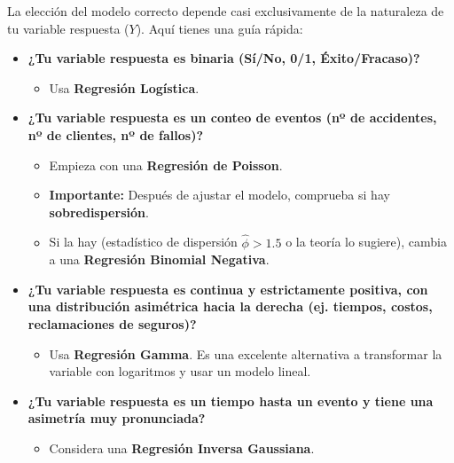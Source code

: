 \documentclass[
  letterpaper,
  DIV=11,
  numbers=noendperiod]{scrreprt}
\providecommand{\tightlist}{%
  \setlength{\itemsep}{0pt}\setlength{\parskip}{0pt}}
\begin{document}
\begin{tcolorbox}[enhanced jigsaw, leftrule=.75mm, breakable, colbacktitle=quarto-callout-warning-color!10!white, bottomrule=.15mm, colframe=quarto-callout-warning-color-frame, toprule=.15mm, colback=white, coltitle=black, bottomtitle=1mm, left=2mm, title=\textcolor{quarto-callout-warning-color}{\faExclamationTriangle}\hspace{0.5em}{¿Qué GLM debo usar?}, opacityback=0, arc=.35mm, opacitybacktitle=0.6, toptitle=1mm, titlerule=0mm, rightrule=.15mm]

La elección del modelo correcto depende casi exclusivamente de la
naturaleza de tu variable respuesta (\(Y\)). Aquí tienes una guía
rápida:

\begin{itemize}
\tightlist
\item
  \textbf{¿Tu variable respuesta es binaria (Sí/No, 0/1,
  Éxito/Fracaso)?}

  \begin{itemize}
  \tightlist
  \item
    Usa \textbf{Regresión Logística}.
  \end{itemize}
\item
  \textbf{¿Tu variable respuesta es un conteo de eventos (nº de
  accidentes, nº de clientes, nº de fallos)?}

  \begin{itemize}
  \tightlist
  \item
    Empieza con una \textbf{Regresión de Poisson}.
  \item
    \textbf{Importante:} Después de ajustar el modelo, comprueba si hay
    \textbf{sobredispersión}.
  \item
    Si la hay (estadístico de dispersión \(\hat{\phi} > 1.5\) o la
    teoría lo sugiere), cambia a una \textbf{Regresión Binomial
    Negativa}.
  \end{itemize}
\item
  \textbf{¿Tu variable respuesta es continua y estrictamente positiva,
  con una distribución asimétrica hacia la derecha (ej. tiempos, costos,
  reclamaciones de seguros)?}

  \begin{itemize}
  \tightlist
  \item
    Usa \textbf{Regresión Gamma}. Es una excelente alternativa a
    transformar la variable con logaritmos y usar un modelo lineal.
  \end{itemize}
\item
  \textbf{¿Tu variable respuesta es un tiempo hasta un evento y tiene
  una asimetría muy pronunciada?}

  \begin{itemize}
  \tightlist
  \item
    Considera una \textbf{Regresión Inversa Gaussiana}.
  \end{itemize}
\end{itemize}

\end{tcolorbox}
\end{document}
